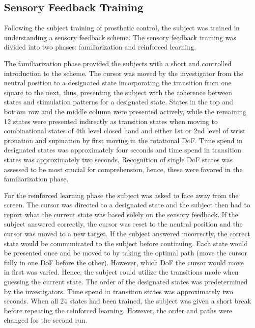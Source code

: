 \subsection{Sensory Feedback Training}

Following the subject training of prosthetic control, the subject was trained in understanding a sensory feedback scheme. The sensory feedback training was divided into two phases: familiarization and reinforced learning. 

The familiarization phase provided the subjects with a short and controlled introduction to the scheme. The cursor was moved by the investigator from the neutral position to a designated state incorporating the transition from one square to the next, thus, presenting the subject with the coherence between states and stimulation patterns for a designated state. States in the top and bottom row and the middle column were presented actively, while the remaining 12 states were presented indirectly as transition states when moving to combinational states of 4th level closed hand and either 1st or 2nd level of wrist pronation and supination by first moving in the rotational DoF. Time spend in designated states was approximately four seconds and time spend in transition states was approximately two seconds. Recognition of single DoF states was assessed to be most crucial for comprehension, hence, these were favored in the familiarization phase. 

For the reinforced learning phase the subject was asked to face away from the screen. The cursor was directed to a designated state and the subject then had to report what the current state was based solely on the sensory feedback. If the subject answered correctly, the cursor was reset to the neutral position and the cursor was moved to a new target. If the subject answered incorrectly, the correct state would be communicated to the subject before continuing. Each state would be presented once and be moved to by taking the optimal path (move the cursor fully in one DoF before the other). However, which DoF the cursor would move in first was varied. Hence, the subject could utilize the transitions made when guessing the current state. The order of the designated states was predetermined by the investigators. Time spend in transition states was approximately two seconds. When all 24 states had been trained, the subject was given a short break before repeating the reinforced learning. However, the order and paths were changed for the second run.